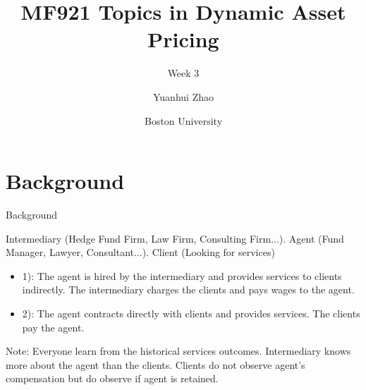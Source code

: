 \documentclass{beamer}
\title{MF921 Topics in Dynamic Asset Pricing}
\subtitle{Week 3}
\author{Yuanhui Zhao}
\date{Boston University}
\begin{document}
\frame{\titlepage}
\section{Background}
\begin{frame}{Background}
\par Intermediary (Hedge Fund Firm, Law Firm, Consulting Firm...). Agent (Fund Manager, Lawyer, Consultant...). Client (Looking for services)
\vspace{2em}
\begin{itemize}
    \item 1): The agent is hired by the intermediary and provides services to clients indirectly. The intermediary charges the clients and pays wages to the agent.
    \vspace{1em}
    \item 2): The agent contracts directly with clients and provides services. The clients pay the agent.
\end{itemize}
\vspace{1em}
\par Note: Everyone learn from the historical services outcomes. Intermediary knows more about the agent than the clients. Clients do not observe agent's compensation but do observe if agent is retained.
\end{frame}





    
\end{document}

